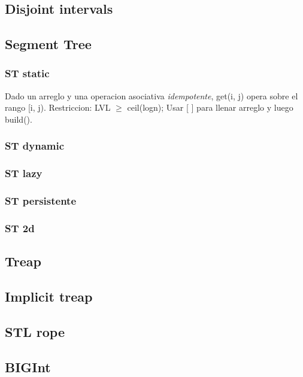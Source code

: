 \subsection{Disjoint intervals}


\subsection{Segment Tree}
\subsubsection{ST static}
Dado un arreglo y una operacion asociativa \emph{idempotente}, get(i, j) opera sobre el rango [i, j). Restriccion: LVL $\ge$ ceil(logn); Usar [ ] para llenar arreglo y luego build().

\subsubsection{ST dynamic}

\subsubsection{ST lazy}

\subsubsection{ST persistente}

\subsubsection{ST 2d}


\subsection{Treap}

\subsection{Implicit treap}

\subsection{STL rope}



\subsection{BIGInt}

